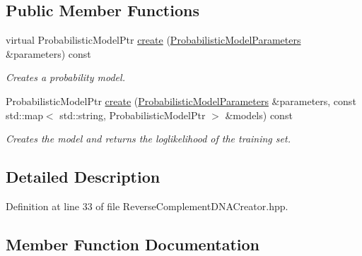 \subsection*{Public Member Functions}
\begin{DoxyCompactItemize}
\item 
virtual Probabilistic\+Model\+Ptr \hyperlink{classtops_1_1ReverseComplementDNACreator_a9928572204114498356297cf0892019b}{create} (\hyperlink{classtops_1_1ProbabilisticModelParameters}{Probabilistic\+Model\+Parameters} \&parameters) const
\begin{DoxyCompactList}\small\item\em Creates a probability model. \end{DoxyCompactList}\item 
\mbox{\label{classtops_1_1ReverseComplementDNACreator_ab50c1dd006aea97ba6727b39935be473}} 
Probabilistic\+Model\+Ptr \hyperlink{classtops_1_1ReverseComplementDNACreator_ab50c1dd006aea97ba6727b39935be473}{create} (\hyperlink{classtops_1_1ProbabilisticModelParameters}{Probabilistic\+Model\+Parameters} \&parameters, const std\+::map$<$ std\+::string, Probabilistic\+Model\+Ptr $>$ \&models) const
\begin{DoxyCompactList}\small\item\em Creates the model and returns the loglikelihood of the training set. \end{DoxyCompactList}\end{DoxyCompactItemize}


\subsection{Detailed Description}


Definition at line 33 of file Reverse\+Complement\+D\+N\+A\+Creator.\+hpp.



\subsection{Member Function Documentation}
\mbox{\label{classtops_1_1ReverseComplementDNACreator_a9928572204114498356297cf0892019b}} 
